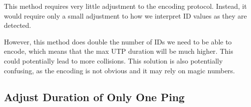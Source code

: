 \documentclass[12pt]{article}
\begin{document}
This method requires very little adjustment to the encoding protocol.
Instead, it would require only a small adjustment to how we interpret ID values
as they are detected.

However, this method does double the number of IDs we need to be able to
encode, which means that the max UTP duration will be much higher.
This could potentially lead to more collisions.
This solution is also potentially confusing, as the encoding is not obvious
and it may rely on magic numbers.

\subsection{Adjust Duration of Only One Ping}
\end{document}
